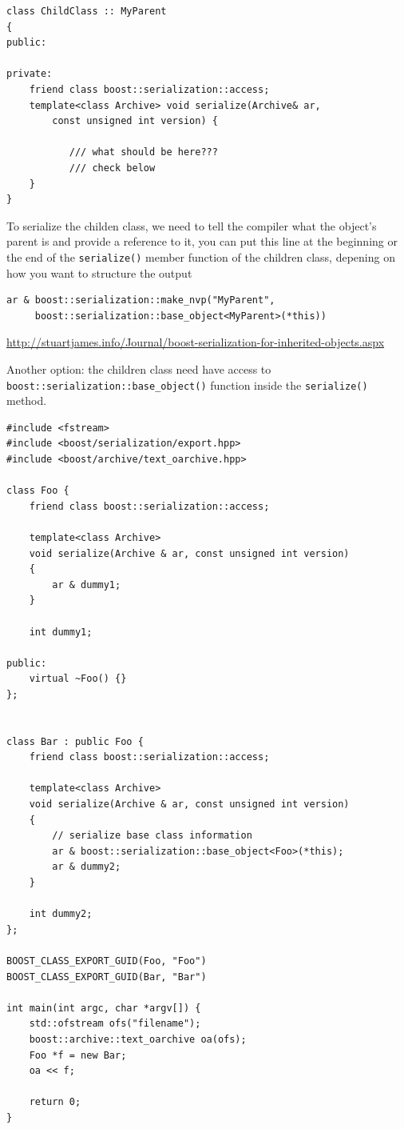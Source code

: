 \begin{lstlisting}
class ChildClass :: MyParent 
{
public:

private:
	friend class boost::serialization::access;
    template<class Archive> void serialize(Archive& ar,
        const unsigned int version) {
          
           /// what should be here???
           /// check below
    }
}
\end{lstlisting}


To serialize the childen class, we need to tell the compiler 
what the object's parent is and provide a reference to it, you can put this line
at the beginning or the end of the \verb!serialize()! member function of the
children class, depening on how you want to structure the output
\begin{verbatim}
ar & boost::serialization::make_nvp("MyParent",
     boost::serialization::base_object<MyParent>(*this))
\end{verbatim}
\url{http://stuartjames.info/Journal/boost-serialization-for-inherited-objects.aspx}

Another option: the children class need have access to
\verb!boost::serialization::base_object()! function inside the
\verb!serialize()! method.
\begin{verbatim}
#include <fstream>
#include <boost/serialization/export.hpp>
#include <boost/archive/text_oarchive.hpp>

class Foo {
    friend class boost::serialization::access;

    template<class Archive>
    void serialize(Archive & ar, const unsigned int version)
    {
        ar & dummy1;
    }

    int dummy1;

public:
    virtual ~Foo() {}
};


class Bar : public Foo {
    friend class boost::serialization::access;

    template<class Archive>
    void serialize(Archive & ar, const unsigned int version)
    {
        // serialize base class information
        ar & boost::serialization::base_object<Foo>(*this);
        ar & dummy2;
    }

    int dummy2;
};

BOOST_CLASS_EXPORT_GUID(Foo, "Foo")
BOOST_CLASS_EXPORT_GUID(Bar, "Bar")

int main(int argc, char *argv[]) {
    std::ofstream ofs("filename");
    boost::archive::text_oarchive oa(ofs);
    Foo *f = new Bar;
    oa << f;

    return 0;
}
\end{verbatim}

